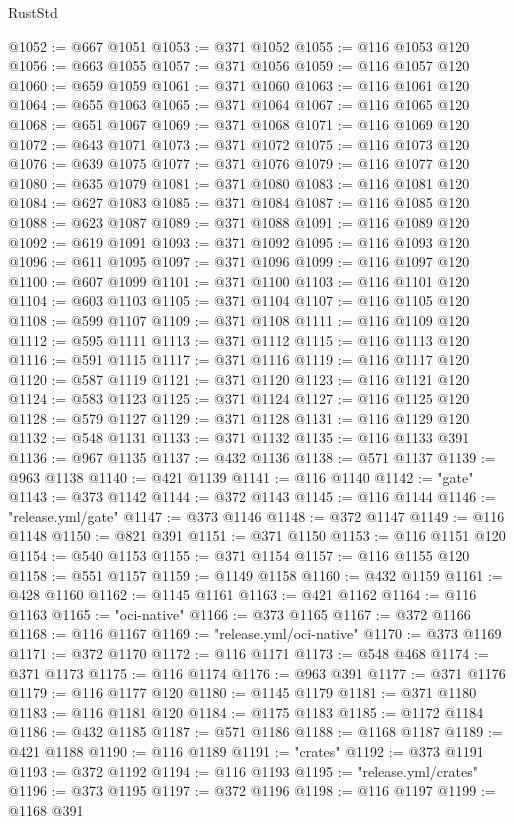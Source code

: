 \begin{lexlean}{RustStd}
\begin{coremodule}
@1052 := @667 @1051
@1053 := @371 @1052
@1055 := @116 @1053 @120
@1056 := @663 @1055
@1057 := @371 @1056
@1059 := @116 @1057 @120
@1060 := @659 @1059
@1061 := @371 @1060
@1063 := @116 @1061 @120
@1064 := @655 @1063
@1065 := @371 @1064
@1067 := @116 @1065 @120
@1068 := @651 @1067
@1069 := @371 @1068
@1071 := @116 @1069 @120
@1072 := @643 @1071
@1073 := @371 @1072
@1075 := @116 @1073 @120
@1076 := @639 @1075
@1077 := @371 @1076
@1079 := @116 @1077 @120
@1080 := @635 @1079
@1081 := @371 @1080
@1083 := @116 @1081 @120
@1084 := @627 @1083
@1085 := @371 @1084
@1087 := @116 @1085 @120
@1088 := @623 @1087
@1089 := @371 @1088
@1091 := @116 @1089 @120
@1092 := @619 @1091
@1093 := @371 @1092
@1095 := @116 @1093 @120
@1096 := @611 @1095
@1097 := @371 @1096
@1099 := @116 @1097 @120
@1100 := @607 @1099
@1101 := @371 @1100
@1103 := @116 @1101 @120
@1104 := @603 @1103
@1105 := @371 @1104
@1107 := @116 @1105 @120
@1108 := @599 @1107
@1109 := @371 @1108
@1111 := @116 @1109 @120
@1112 := @595 @1111
@1113 := @371 @1112
@1115 := @116 @1113 @120
@1116 := @591 @1115
@1117 := @371 @1116
@1119 := @116 @1117 @120
@1120 := @587 @1119
@1121 := @371 @1120
@1123 := @116 @1121 @120
@1124 := @583 @1123
@1125 := @371 @1124
@1127 := @116 @1125 @120
@1128 := @579 @1127
@1129 := @371 @1128
@1131 := @116 @1129 @120
@1132 := @548 @1131
@1133 := @371 @1132
@1135 := @116 @1133 @391
@1136 := @967 @1135
@1137 := @432 @1136
@1138 := @571 @1137
@1139 := @963 @1138
@1140 := @421 @1139
@1141 := @116 @1140
@1142 := "gate"
@1143 := @373 @1142
@1144 := @372 @1143
@1145 := @116 @1144
@1146 := "release.yml/gate"
@1147 := @373 @1146
@1148 := @372 @1147
@1149 := @116 @1148
@1150 := @821 @391
@1151 := @371 @1150
@1153 := @116 @1151 @120
@1154 := @540 @1153
@1155 := @371 @1154
@1157 := @116 @1155 @120
@1158 := @551 @1157
@1159 := @1149 @1158
@1160 := @432 @1159
@1161 := @428 @1160
@1162 := @1145 @1161
@1163 := @421 @1162
@1164 := @116 @1163
@1165 := "oci-native"
@1166 := @373 @1165
@1167 := @372 @1166
@1168 := @116 @1167
@1169 := "release.yml/oci-native"
@1170 := @373 @1169
@1171 := @372 @1170
@1172 := @116 @1171
@1173 := @548 @468
@1174 := @371 @1173
@1175 := @116 @1174
@1176 := @963 @391
@1177 := @371 @1176
@1179 := @116 @1177 @120
@1180 := @1145 @1179
@1181 := @371 @1180
@1183 := @116 @1181 @120
@1184 := @1175 @1183
@1185 := @1172 @1184
@1186 := @432 @1185
@1187 := @571 @1186
@1188 := @1168 @1187
@1189 := @421 @1188
@1190 := @116 @1189
@1191 := "crates"
@1192 := @373 @1191
@1193 := @372 @1192
@1194 := @116 @1193
@1195 := "release.yml/crates"
@1196 := @373 @1195
@1197 := @372 @1196
@1198 := @116 @1197
@1199 := @1168 @391

\end{coremodule}
\end{lexlean}
